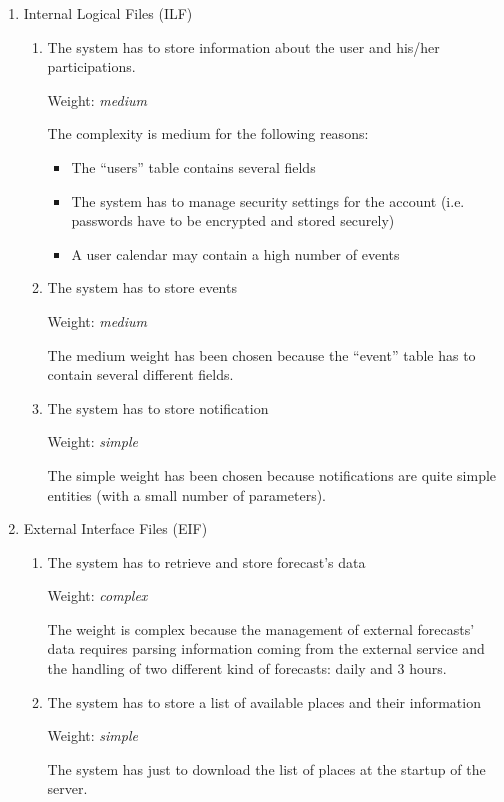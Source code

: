 \documentclass[10pt,a4paper,titlepage]{article}
\begin{document}
\begin{enumerate}
\item Internal Logical Files (ILF)

\begin{enumerate}
\item  The system has to store information about the user and his/her participations.

Weight: \textit{medium}

The complexity is medium for the following reasons:
\begin{itemize}
\item The ``users'' table contains several fields
\item The system has to manage security settings for the account (i.e. passwords have to be encrypted and stored securely)  
\item A user calendar may contain a high number of events 
\end{itemize}

\item The system has to store events

Weight: \textit{medium}

The medium weight has been chosen because the ``event'' table has to contain several different fields. 

\item The system has to store notification 

Weight: \textit{simple }

The simple weight has been chosen because notifications are quite simple entities (with a small number of parameters). 
\end{enumerate}

\item External Interface Files (EIF)
\begin{enumerate}
\item The system has to retrieve and store forecast's data 
 
Weight: \textit{complex }
 
The weight is complex because the management of external forecasts' data requires parsing information coming from the external service and the handling of two different kind of forecasts: daily and 3 hours.
 
\item The system has to store a list of available places and their information 
 
Weight: \textit{simple }
 
The system has just to download the list of places at the startup of the server. 
\end{enumerate}


\end{enumerate}
\end{document}
